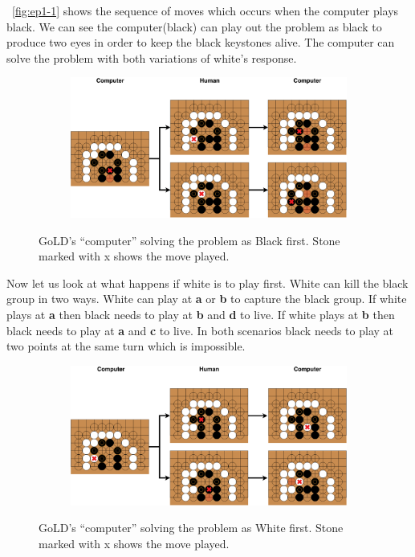 \documentclass{l4proj}
\newcommand{\bo}[1]{\textbf{#1}}
\begin{document}
~\autoref{fig:ep1-1} shows the sequence of moves which occurs when the computer plays black. We can see the computer(black) can play out the problem as black to produce two eyes in order to keep the black keystones alive. The computer can solve the problem with both variations of white’s response.

\begin{figure}[!ht]
\centering
\begin{subfigure}[b]{\textwidth}
\includegraphics[width=\textwidth]{ep1/ep1-1.pdf}
\end{subfigure}
\caption{GoLD’s “computer” solving the problem as Black first. Stone marked with x shows the move played.}
\label{fig:ep1-1}
\end{figure}

Now let us look at what happens if white is to play first. White can kill the black group in two ways. White can play at \bo{a} or \bo{b} to capture the black group. If white plays at \bo{a} then black needs to play at \bo{b} and \bo{d} to live. If white plays at \bo{b} then black needs to play at \bo{a} and \bo{c} to live. In both scenarios black needs to play at two points at the same turn which is impossible.

\begin{figure}[!ht]
\centering
\begin{subfigure}[b]{\textwidth}
\includegraphics[width=\textwidth]{ep1/ep1-2.pdf}
\end{subfigure}
\caption{ GoLD’s “computer” solving the problem as White first. Stone marked with x shows the move played.}
\label{fig:ep1-2}
\end{figure}
\end{document}

